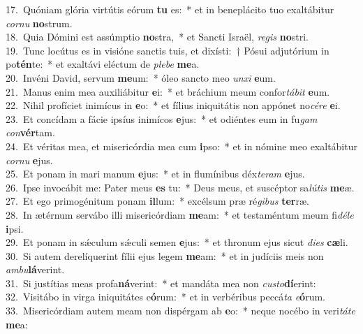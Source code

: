 {17.~}Quóniam glória virtútis eórum \textbf{tu} es:~* et in beneplácito tuo exaltábitur \textit{cor}\textit{nu} \textbf{no}strum.\\
{18.~}Quia Dómini est assúmptio \textbf{no}stra,~* et Sancti Israël, \textit{re}\textit{gis} \textbf{no}stri.\\
{19.~}Tunc locútus es in visióne sanctis tuis, et dixísti:~† Pósui adjutórium in po\textbf{tén}te:~* et exaltávi eléctum de \textit{ple}\textit{be} \textbf{me}a.\\
{20.~}Invéni David, servum \textbf{me}um:~* óleo sancto meo \textit{un}\textit{xi} \textbf{e}um.\\
{21.~}Manus enim mea auxiliábitur \textbf{e}i:~* et bráchium meum confor\textit{tá}\textit{bit} \textbf{e}um.\\
{22.~}Nihil profíciet inimícus in \textbf{e}o:~* et fílius iniquitátis non appónet no\textit{cé}\textit{re} \textbf{e}i.\\
{23.~}Et concídam a fácie ipsíus inimícos \textbf{e}jus:~* et odiéntes eum in fu\textit{gam} \textit{con}\textbf{vér}tam.\\
{24.~}Et véritas mea, et misericórdia mea cum \textbf{i}pso:~* et in nómine meo exaltábitur \textit{cor}\textit{nu} \textbf{e}jus.\\
{25.~}Et ponam in mari manum \textbf{e}jus:~* et in flumínibus déx\textit{te}\textit{ram} \textbf{e}jus.\\
{26.~}Ipse invocábit me: Pater meus \textbf{es} tu:~* Deus meus, et suscéptor sa\textit{lú}\textit{tis} \textbf{me}æ.\\
{27.~}Et ego primogénitum ponam \textbf{il}lum:~* excélsum præ ré\textit{gi}\textit{bus} \textbf{ter}ræ.\\
{28.~}In ætérnum servábo illi misericórdiam \textbf{me}am:~* et testaméntum meum fi\textit{dé}\textit{le} \textbf{i}psi.\\
{29.~}Et ponam in sǽculum sǽculi semen \textbf{e}jus:~* et thronum ejus sicut \textit{di}\textit{es} \textbf{cæ}li.\\
{30.~}Si autem derelíquerint fílii ejus legem \textbf{me}am:~* et in judíciis meis non \textit{am}\textit{bu}\textbf{lá}verint.\\
{31.~}Si justítias meas profa\textbf{ná}verint:~* et mandáta mea non \textit{cu}\textit{sto}\textbf{dí}erint:\\
{32.~}Visitábo in virga iniquitátes e\textbf{ó}rum:~* et in verbéribus peccá\textit{ta} \textit{e}\textbf{ó}rum.\\
{33.~}Misericórdiam autem meam non dispérgam ab \textbf{e}o:~* neque nocébo in veri\textit{tá}\textit{te} \textbf{me}a:\\
